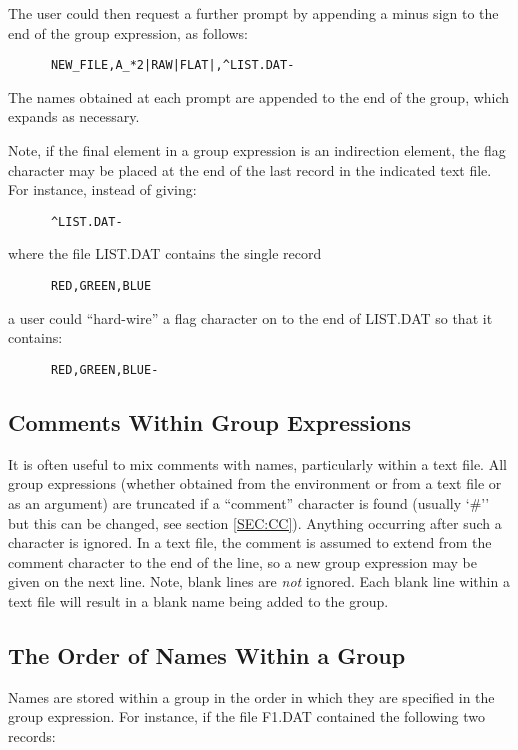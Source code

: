 The user could then request a further prompt by appending a minus sign to the
end of the group expression, as follows:

\small
\begin{verbatim}
      NEW_FILE,A_*2|RAW|FLAT|,^LIST.DAT-
\end{verbatim}
\normalsize

The names obtained at each prompt are appended to the end of the group, which
expands as necessary.

Note, if the final element in a group expression is an indirection element, the
flag character may be placed at the end of the last record in the indicated text
file. For instance, instead of giving:

\small
\begin{verbatim}
      ^LIST.DAT-
\end{verbatim}
\normalsize

where the file LIST.DAT contains the single record

\small
\begin{verbatim}
      RED,GREEN,BLUE
\end{verbatim}
\normalsize

a user could ``hard-wire'' a flag character on to the end of LIST.DAT so that
it contains:

\small
\begin{verbatim}
      RED,GREEN,BLUE-
\end{verbatim}
\normalsize

\subsection{Comments Within Group Expressions}
It is often useful to mix comments with names, particularly within a text file.
All group expressions (whether obtained from the environment or from a text
file or as an argument) are truncated if a ``comment'' character is found (usually `\#'' but this
can be changed, see section \ref{SEC:CC}). Anything occurring after such a
character is ignored. In a text file, the comment is assumed to extend from the
comment character to the end of the line, so a new group expression may be
given on the next line. Note, blank lines are {\em not} ignored. Each blank line
within a text file will result in a blank name being added to the group.

\subsection{The Order of Names Within a Group}
Names are stored within a group in the order in which they are specified in the
group expression. For instance, if the file F1.DAT contained the following two
records:

